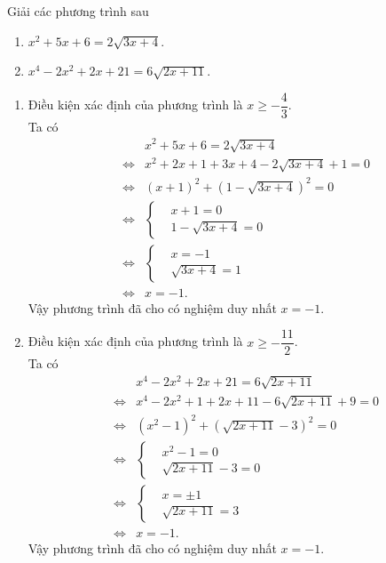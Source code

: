 \begin{vd}
	Giải các phương trình sau
	\begin{multicols}{2}
		\begin{enumerate}
			\item $x^2+5x+6=2\sqrt{3x+4}$.
			\item $x^4-2x^2+2x+21=6\sqrt{2x+11}$.
		\end{enumerate}
	\end{multicols}
	\loigiai
	{
		\begin{enumerate}
			\item 
			Điều kiện xác định của phương trình là $x\geq - \dfrac{4}{3}$.\\
			Ta có
			\allowdisplaybreaks
			\begin{eqnarray*}
				&& x^2+5x+6=2\sqrt{3x+4}\\
				&\Leftrightarrow & x^2+2x+1 +3x+4-2\sqrt{3x+4}+1=0\\
				&\Leftrightarrow & (x+1)^2 +\left(1-\sqrt{3x+4}\right)^2 =0\\
				&\Leftrightarrow & \left\{\begin{aligned}&x+1=0 \\&1-\sqrt{3x+4}=0\end{aligned}\right.\\
				&\Leftrightarrow & \left\{\begin{aligned}&x=-1 \\&\sqrt{3x+4}=1\end{aligned}\right.\\
				&\Leftrightarrow & x=-1.
			\end{eqnarray*}
			Vậy phương trình đã cho có nghiệm duy nhất $x=-1$.
			\item Điều kiện xác định của phương trình là $x\geq - \dfrac{11}{2}$.\\
			Ta có
			\allowdisplaybreaks
			\begin{eqnarray*}
				&& x^4-2x^2+2x+21=6\sqrt{2x+11}\\
				&\Leftrightarrow & x^4-2x^2+1 +2x+11-6\sqrt{2x+11}+9=0\\
				&\Leftrightarrow & (x^2-1)^2 +\left(\sqrt{2x+11}-3\right)^2 =0\\
				&\Leftrightarrow & \left\{\begin{aligned}&x^2-1=0 \\&\sqrt{2x+11}-3=0\end{aligned}\right.\\
				&\Leftrightarrow & \left\{\begin{aligned}&x=\pm1 \\&\sqrt{2x+11}=3\end{aligned}\right.\\
				&\Leftrightarrow & x=-1.
			\end{eqnarray*}
			Vậy phương trình đã cho có nghiệm duy nhất $x=-1$.
		\end{enumerate}
	}
\end{vd}


